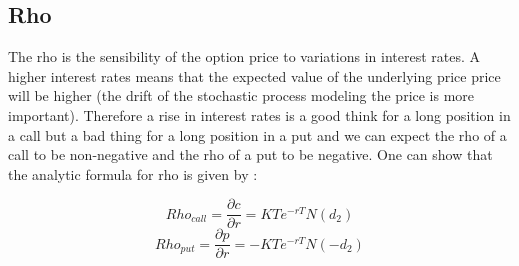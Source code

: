 \documentclass[hidelinks]{article}
\begin{document}
    \newpage
    \subsection{Rho}
    
    The rho is the sensibility of the option price to variations in interest rates. A higher interest rates means that the expected value of the underlying price price will be higher (the drift of the stochastic process modeling the price is more important). Therefore a rise in interest rates is a good think for a long position in a call but a bad thing for a long position in a put and we can expect the rho of a call to be non-negative and the rho of a put to be negative.  One can show that the analytic formula for rho is given by :
    
    $$Rho_{call} = \frac{\partial c}{\partial r} = KTe^{-rT}N(d_2)$$
    $$Rho_{put} = \frac{\partial p}{\partial r} = -KTe^{-rT}N(-d_2)$$
\end{document}

